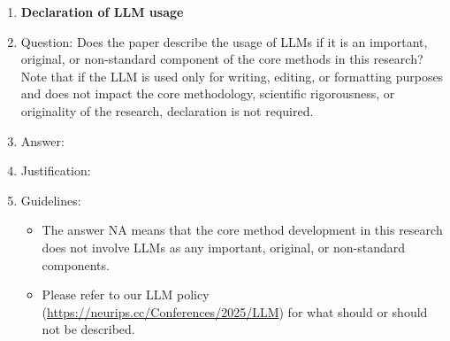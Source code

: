 \documentclass{article}
\begin{document}
\begin{enumerate}
\item {\bf Declaration of LLM usage}
    \item[] Question: Does the paper describe the usage of LLMs if it is an important, original, or non-standard component of the core methods in this research? Note that if the LLM is used only for writing, editing, or formatting purposes and does not impact the core methodology, scientific rigorousness, or originality of the research, declaration is not required.
    \item[] Answer: \answerNA{} %
    \item[] Justification: \answerNA{}
    \item[] Guidelines:
    \begin{itemize}
        \item The answer NA means that the core method development in this research does not involve LLMs as any important, original, or non-standard components.
        \item Please refer to our LLM policy (\url{https://neurips.cc/Conferences/2025/LLM}) for what should or should not be described.
    \end{itemize}

\end{enumerate}
\end{document}
